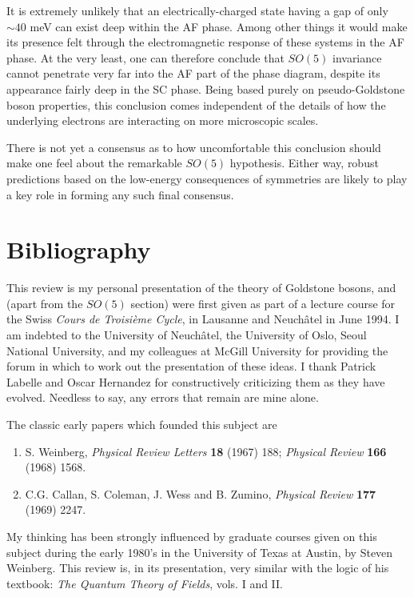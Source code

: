 \documentclass[12pt,epsf]{report}
\begin{document}
It is extremely unlikely that an electrically-charged state
having a gap of only $\sim 40$ meV can exist deep within the
AF phase. Among other things it would make its presence felt
through the electromagnetic response of these systems in the
AF phase. At the very least, one can therefore conclude that
$SO(5)$ invariance cannot penetrate very far into the AF
part of the phase diagram, despite its appearance fairly
deep in the SC phase. Being based purely on
pseudo-Goldstone boson properties, this conclusion comes
independent of the details of how the underlying electrons
are interacting on more microscopic scales.

There is not yet a consensus as to how uncomfortable this
conclusion should make one feel about the remarkable
$SO(5)$ hypothesis. Either way, robust predictions based on
the low-energy consequences of symmetries are likely to play
a key role in forming any such final consensus.

\chapter{Bibliography}

This review is my personal presentation of the theory of
Goldstone bosons, and (apart from the $SO(5)$ section) were
first given as part of a lecture course for the Swiss {\it
Cours de Troisi\`eme Cycle}, in Lausanne and Neuch\^atel in
June 1994. I am indebted to the University of Neuch\^atel,
the University of Oslo, Seoul National University, and my
colleagues at McGill University for providing the forum in
which to work out the presentation of these ideas. I
thank Patrick Labelle and Oscar Hernandez for constructively criticizing them as they have evolved. Needless to say, any errors that remain are mine alone.

The classic early papers which founded this subject are

\begin{enumerate}

\item
S. Weinberg, {\it Physical Review Letters} {\bf 18} (1967)
188;
{\it Physical Review}  {\bf 166} (1968) 1568. 

\item
C.G. Callan, S. Coleman, J. Wess and B. Zumino, {\it
Physical Review} {\bf 177} (1969) 2247.

\end{enumerate}

My thinking has been  strongly influenced by graduate
courses given on this subject during the early 1980's in
the University of Texas at Austin, by Steven Weinberg.
This review is, in its presentation,  very similar
with  the logic of his textbook: {\sl The Quantum Theory of
Fields}, vols. I and II.
\end{document}
